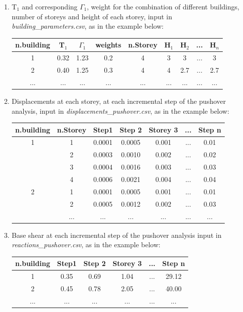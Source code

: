 \begin{enumerate}
\item T$_1$ and corresponding $\Gamma_1$, weight for the combination of different buildings, number of storeys and height of each storey, input in \textit{building\_parameters.csv}, as in the example below:
	\begin{table}[H]
	\centering
	\begin{tabular}{|c|c|c|c|c|c|c|c|c|} \hline
	\textbf{n.building} & \textbf{T$_1$} & \textbf{$\Gamma_1$} & \textbf{weights} & \textbf{n.Storey} & \textbf{H$_1$} & \textbf{H$_2$} & ... & \textbf{H$_n$} \\ \hline
	1 & 0.32 & 1.23 & 0.2 & 4 & 3 & 3 & ... & 3 \\ \hline
	2 & 0.40 & 1.25 & 0.3 & 4 & 4 & 2.7 & ... & 2.7 \\ \hline
	... & ... & ... & ... & ... & ... & ... & ... & ... \\ \hline
	\end{tabular}
	\end{table}
	
\item Displacements at each storey, at each incremental step of the pushover analysis, input in \textit{displacements\_pushover.csv}, as in the example below: 
	\begin{table}[H]
	\centering
	\begin{tabular}{|c|c|c|c|c|c|c|} \hline
	\textbf{n.building} & \textbf{n.Storey} & \textbf{Step1} & \textbf{Step 2} & \textbf{Storey 3} & ... & \textbf{Step n}\\ \hline
	1 &	1 & 0.0001 &	0.0005 &	0.001 & ... & 0.01\\ \hline
	   &	2 & 0.0003 &	0.0010 &	0.002 & ... & 0.02\\ \hline
	   &	3 & 0.0004 &	0.0016 &	0.003 & ... & 0.03\\ \hline
	   &	4 & 0.0006 &	0.0021 &	0.004 & ... & 0.04\\ \hline
	2 &	1 & 0.0001 &	0.0005 &	0.001 & ... & 0.01\\ \hline
	   &	2 & 0.0005 &	0.0012 &	0.002 & ... & 0.03\\ \hline
	   &	... & ... &	... &	... & ... & ...\\ \hline
	\end{tabular}
	\end{table}
	
\item Base shear at each incremental step of the pushover analysis input in \textit{reactions\_pushover.csv}, as in the example below:
	\begin{table}[H]
	\centering
	\begin{tabular}{|c|c|c|c|c|c|} \hline
	\textbf{n.building} &	\textbf{Step1} & \textbf{Step 2} & \textbf{Storey 3} & ... & \textbf{Step n} \\ \hline
	1 & 0.35 & 0.69 & 1.04 & ... & 29.12\\ \hline
	2 & 0.45 & 0.78 & 2.05 & ... & 40.00\\ \hline
	... & ... & ... & ... & ... & ...\\ \hline
	\end{tabular}
	\end{table}
	

\end{enumerate}
